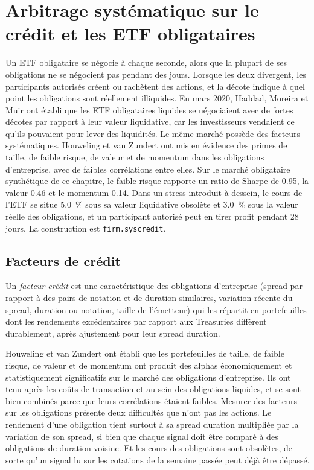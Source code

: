 \chapter{Arbitrage systématique sur le crédit et les ETF obligataires}\label{ch:s2:systematic-credit-and-bond-etf-arbitrage}

Un ETF obligataire se négocie à chaque seconde, alors que la plupart de ses obligations ne se négocient pas pendant des jours. Lorsque les deux divergent, les participants autorisés créent ou rachètent des actions,
et la décote indique à quel point les obligations sont réellement illiquides. En mars 2020, Haddad, Moreira et Muir ont établi que les ETF obligataires liquides se négociaient avec de fortes décotes par rapport à
leur valeur liquidative, car les investisseurs vendaient ce qu'ils pouvaient pour lever des liquidités. Le même marché possède des facteurs systématiques. Houweling et van Zundert ont mis en évidence des primes de taille,
de faible risque, de valeur et de momentum dans les obligations d'entreprise, avec de faibles corrélations entre elles. Sur le marché obligataire synthétique de ce chapitre, le faible risque rapporte un
ratio de Sharpe de 0.95, la valeur 0.46 et le momentum 0.14. Dans un stress introduit à dessein, le cours de l'ETF se situe 5.0~\% sous sa valeur liquidative obsolète et 3.0~\% sous la valeur réelle des
obligations, et un participant autorisé peut en tirer profit pendant 28 jours. La construction est \texttt{firm.syscredit}.

\section{Facteurs de crédit}

\begin{definition}\label{def:s2:systematic-credit-and-bond-etf-arbitrage:factor}
Un \emph{facteur crédit} est une caractéristique des obligations d'entreprise (spread par rapport à des pairs de notation et de duration similaires, variation récente du spread,
duration ou notation, taille de l'émetteur) qui les répartit en portefeuilles dont les rendements excédentaires par rapport aux Treasuries diffèrent durablement, après ajustement
pour leur spread duration.
\end{definition}

Houweling et van Zundert ont établi que les portefeuilles de taille, de faible risque, de valeur et de momentum ont produit des alphas économiquement et statistiquement
significatifs sur le marché des obligations d'entreprise. Ils ont tenu après les coûts de transaction et au sein des obligations liquides, et se sont bien combinés parce que leurs corrélations étaient faibles.
Mesurer des facteurs sur les obligations présente deux difficultés que n'ont pas les actions. Le rendement d'une obligation tient surtout à sa spread duration multipliée par la
variation de son spread, si bien que chaque signal doit être comparé à des obligations de duration voisine. Et les cours des obligations sont obsolètes, de sorte qu'un signal lu sur les cotations de la semaine passée peut déjà être
dépassé.

